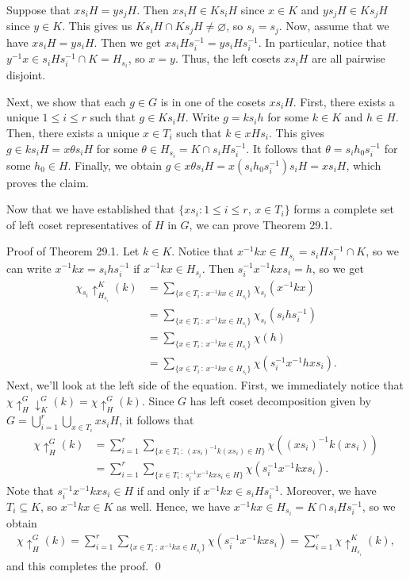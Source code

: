 Suppose that $xs_iH = ys_jH$. Then $xs_iH \in Ks_iH$ since $x \in K$ and 
$ys_jH \in Ks_jH$ since $y \in K$. This gives us $Ks_iH \cap Ks_jH \neq 
\varnothing$, so $s_i = s_j$. Now, assume that we have $xs_iH = ys_iH$. 
Then we get $xs_iHs_i^{-1} = ys_iHs_i^{-1}$. In particular, notice that 
$y^{-1}x \in s_iHs_i^{-1} \cap K = H_{s_i}$, so $x = y$. Thus, the left cosets 
$xs_iH$ are all pairwise disjoint. 

Next, we show that each $g \in G$ is in one of the cosets $xs_iH$. 
First, there exists a unique $1 \leq i \leq r$ such that $g \in Ks_iH$. 
Write $g = ks_ih$ for some $k \in K$ and $h \in H$. Then, there exists a 
unique $x \in T_i$ such that $k \in xHs_i$. This gives $g \in ks_iH = 
x\theta s_iH$ for some $\theta \in H_{s_i} = K \cap s_iHs_i^{-1}$. 
It follows that $\theta = s_ih_0s_i^{-1}$ for some $h_0 \in H$. Finally, 
we obtain $g \in x\theta s_iH = x(s_ih_0s_i^{-1})s_i H = xs_i H$,
which proves the claim. 

Now that we have established that $\{xs_i : 1 \leq i \leq r,\,x\in T_i\}$ 
forms a complete set of left coset representatives of $H$ in $G$, 
we can prove Theorem 29.1. 

{\sc Proof of Theorem 29.1.} Let $k \in K$. Notice that 
$x^{-1}kx \in H_{s_i} = s_iHs_i^{-1} \cap K$, so we can write 
$x^{-1}kx = s_ihs_i^{-1}$ if $x^{-1}kx \in H_{s_i}$. Then $s_i^{-1}x^{-1}kxs_i 
= h$, so we get 
\begin{align*}
    \chi_{s_i} \uparrow_{H_{s_i}}^K (k) 
    &= \sum_{\{x\in T_i\,:\,x^{-1}kx\in H_{s_i}\}} \chi_{s_i}(x^{-1}kx) \\
    &= \sum_{\{x\in T_i\,:\,x^{-1}kx\in H_{s_i}\}} \chi_{s_i}(s_ihs_i^{-1}) \\  
    &= \sum_{\{x\in T_i\,:\,x^{-1}kx\in H_{s_i}\}} \chi(h) \\ 
    &= \sum_{\{x\in T_i\,:\,x^{-1}kx\in H_{s_i}\}} \chi(s_i^{-1}x^{-1}hxs_i).
\end{align*}
Next, we'll look at the left side of the equation. First, we immediately 
notice that $\chi \uparrow_H^G \downarrow_K^G (k) = \chi \uparrow_H^G (k)$. 
Since $G$ has left coset decomposition given by $G = \bigcup_{i=1}^r 
\bigcup_{x\in T_i} xs_i H$, it follows that 
\begin{align*}
    \chi \uparrow_H^G (k) 
    &= \sum_{i=1}^r \sum_{\{x\in T_i\,:\,(xs_i)^{-1}k(xs_i) \in H\}} \chi((xs_i)^{-1}k(xs_i)) \\
    &= \sum_{i=1}^r \sum_{\{x\in T_i\,:\,s_i^{-1}x^{-1}kxs_i \in H\}} \chi(s_i^{-1}x^{-1}kxs_i). 
\end{align*} 
Note that $s_i^{-1}x^{-1}kxs_i \in H$ if and only if $x^{-1}kx \in s_iHs_i^{-1}$. 
Moreover, we have $T_i \subseteq K$, so $x^{-1}kx \in K$ as well. 
Hence, we have $x^{-1}kx \in H_{s_i} = K \cap s_iHs_i^{-1}$, so we obtain 
\begin{align*}
    \chi \uparrow_H^G (k) 
    = \sum_{i=1}^r \sum_{\{x\in T_i\,:\,x^{-1}kx \in H_{s_i}\}} \chi(s_i^{-1}x^{-1}kxs_i) 
    = \sum_{i=1}^r \chi \uparrow_{H_{s_i}}^K (k),
\end{align*}
and this completes the proof. \qed